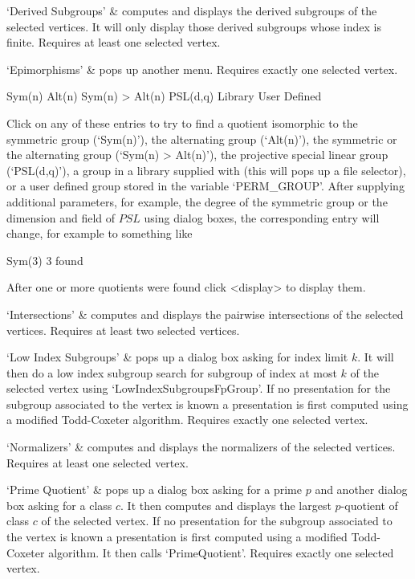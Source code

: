 `Derived Subgroups' &
computes and displays the derived subgroups of the selected vertices.  It
will  only  display  those derived    subgroups  whose index is   finite.
Requires at least one selected vertex.

`Epimorphisms' &
pops up another menu. Requires exactly one selected vertex.

\begintt
Sym(n)
Alt(n)
Sym(n) > Alt(n)
PSL(d,q)
Library
User Defined 
\endtt

Click on any of these entries to try to find a quotient isomorphic to the
symmetric group (`Sym(n)'), the alternating group (`Alt(n)'),
the symmetric or the alternating group (`Sym(n) > Alt(n)'), the projective
special linear group (`PSL(d,q)'), a group in a library supplied with
{\XGAP} (this will pops up a file selector), or a user defined group stored
in the variable `PERM_GROUP'.  After supplying additional parameters, for
example, the degree of the symmetric group or the dimension and field of
$PSL$ using dialog boxes, the corresponding entry will change, for example
to something like

\begintt
Sym(3)        3 found
\endtt

After one or more quotients were found click <display> to display them.

`Intersections' &
computes and   displays   the pairwise   intersections  of  the  selected
vertices.  Requires at least two selected vertices.

`Low Index Subgroups' &
pops up a dialog box asking for index  limit $k$.  It  will then do a low
index subgroup search for  subgroup of index at  most $k$ of the selected
vertex using `LowIndexSubgroupsFpGroup'.    If no  presentation  for  the
subgroup   associated to  the vertex  is  known a  presentation  is first
computed using a  modified  Todd-Coxeter algorithm. Requires  exactly one
selected vertex.

`Normalizers' &
computes and displays the normalizers of the selected vertices.  Requires
at least one selected vertex.

`Prime Quotient' &
pops up a dialog box asking for a prime $p$ and another dialog box asking
for a class $c$.  It then  computes and displays the largest $p$-quotient
of class $c$ of the selected vertex.  If no presentation for the subgroup
associated to the vertex is known a  presentation is first computed using
a   modified  Todd-Coxeter algorithm.   It    then calls `PrimeQuotient'.
Requires exactly one selected vertex.
\enditems

